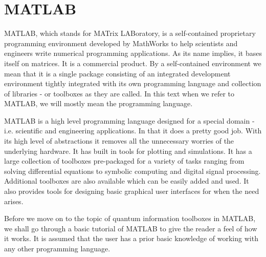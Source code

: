 \section{MATLAB}
MATLAB, which stands for MATrix LABoratory, is a self-contained proprietary programming environment developed by MathWorks to help scientists and engineers write numerical programming applications. As its name implies, it bases itself on matrices. It is a commercial product. By a self-contained environment we mean that it is a single package consisting of an integrated development environment tightly integrated with its own programming language and collection of libraries - or toolboxes as they are called. In this text when we refer to MATLAB, we will mostly mean the programming language.
\par MATLAB is a high level programming language designed for a special domain - i.e. scientific and engineering applications. In that it does a pretty good job. With its high level of abstractions it removes all the unnecessary worries of the underlying hardware. It has built in tools for plotting and simulations. It has a large collection of toolboxes pre-packaged for a variety of tasks ranging from solving differential equations to symbolic computing and digital signal processing. Additional toolboxes are also available which can be easily added and used. It also provides tools for designing basic graphical user interfaces for when the need arises.
\par Before we move on to the topic of quantum information toolboxes in MATLAB, we shall go through a basic tutorial of MATLAB to give the reader a feel of how it works. It is assumed that the user has a prior basic knowledge of working with any other programming language.

